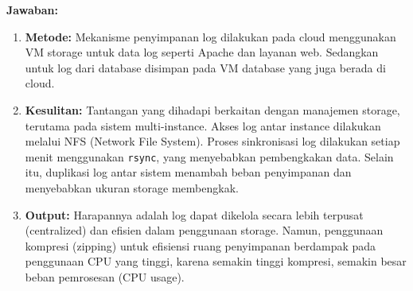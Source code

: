 \vspace{0.3cm}
\textbf{Jawaban:}
\begin{enumerate}
    \item \textbf{Metode:} Mekanisme penyimpanan log dilakukan pada cloud menggunakan VM storage untuk data log seperti Apache dan layanan web. Sedangkan untuk log dari database disimpan pada VM database yang juga berada di cloud.
    
    \item \textbf{Kesulitan:} Tantangan yang dihadapi berkaitan dengan manajemen storage, terutama pada sistem multi-instance. Akses log antar instance dilakukan melalui NFS (Network File System). Proses sinkronisasi log dilakukan setiap menit menggunakan \texttt{rsync}, yang menyebabkan pembengkakan data. Selain itu, duplikasi log antar sistem menambah beban penyimpanan dan menyebabkan ukuran storage membengkak.
    
    \item \textbf{Output:} Harapannya adalah log dapat dikelola secara lebih terpusat (centralized) dan efisien dalam penggunaan storage. Namun, penggunaan kompresi (zipping) untuk efisiensi ruang penyimpanan berdampak pada penggunaan CPU yang tinggi, karena semakin tinggi kompresi, semakin besar beban pemrosesan (CPU usage).
\end{enumerate}
